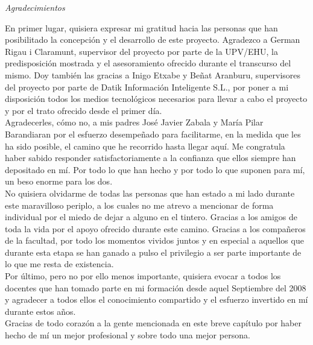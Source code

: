 \begin{flushright}
	\Large\textit{Agradecimientos}
\end{flushright}

En primer lugar, quisiera expresar mi gratitud hacia las personas que han posibilitado la concepción y el desarrollo de este proyecto. Agradezco a German Rigau i Claramunt, supervisor del proyecto por parte de la UPV/EHU, la predisposición mostrada y el asesoramiento ofrecido durante el transcurso del mismo. Doy también las gracias a Inigo Etxabe y Beñat Aranburu, supervisores del proyecto por parte de Datik Información Inteligente S.L., por poner a mi disposición todos los medios tecnológicos necesarios para llevar a cabo el proyecto y por el trato ofrecido desde el primer día.\\

Agradecerles, cómo no, a mis padres José Javier Zabala y María Pilar Barandiaran por el esfuerzo desempeñado para facilitarme, en la medida que les ha sido posible, el camino que he recorrido hasta llegar aquí. Me congratula haber sabido responder satisfactoriamente a la confianza que ellos siempre han depositado en mí. Por todo lo que han hecho y por todo lo que suponen para mí, un beso enorme para los dos.\\

No quisiera olvidarme de todas las personas que han estado a mi lado durante este maravilloso periplo, a los cuales no me atrevo a mencionar de forma individual por el miedo de dejar a alguno en el tintero. Gracias a los amigos de toda la vida por el apoyo ofrecido durante este camino. Gracias a los compañeros de la facultad, por todo los momentos vividos juntos y en especial a aquellos que durante esta etapa se han ganado a pulso el privilegio a ser parte importante de lo que me resta de existencia.\\

Por último, pero no por ello menos importante, quisiera evocar a todos los docentes que han tomado parte en mi formación desde aquel Septiembre del 2008 y agradecer a todos ellos el conocimiento compartido y el esfuerzo invertido en mí durante estos años.\\

Gracias de todo corazón a la gente mencionada en este breve capítulo por haber hecho de mí un mejor profesional y sobre todo una mejor persona.\\

